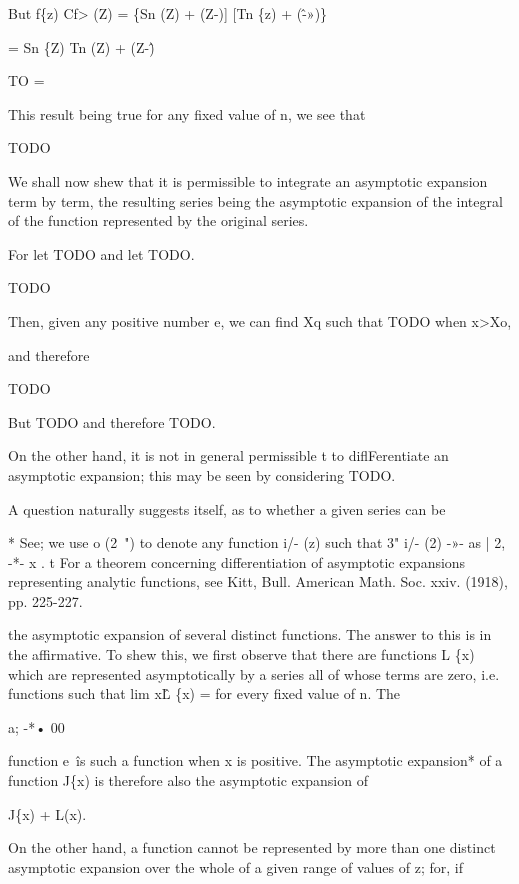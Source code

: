 But f\{z) Cf> (Z) = \{Sn (Z) + (Z-)] [Tn \{z) + (\^-»)\}

= Sn \{Z) Tn (Z) + (Z-\^)

TO =

This result being true for any fixed value of n, we see that

TODO


We shall now shew that it is permissible to integrate an asymptotic
expansion term by term, the resulting series being the asymptotic
expansion of the integral of the function represented by the original
series.

For let TODO and let TODO.

TODO

Then, given any positive number e, we can find Xq such that TODO when
x>Xo,

and therefore

TODO

But TODO and therefore TODO.

On the other hand, it is not in general permissible t to
diflFerentiate an asymptotic expansion; this may be seen by
considering TODO.


A question naturally suggests itself, as to whether a given series can
be

* See; we use o (2~") to denote any function i/- (z) such that
3" i/- (2) -»- as | 2, -*- x . t For a theorem concerning
differentiation of asymptotic expansions representing analytic
functions, see Kitt, Bull. American Math. Soc. xxiv. (1918), pp.
225-227.

%
%

the asymptotic expansion of several distinct functions. The answer to
this is in the affirmative. To shew this, we first observe that there
are functions L \{x) which are represented asymptotically by a series
all of whose terms are zero, i.e. functions such that lim x\^L \{x) =
for every fixed value of n. The

a; -*• 00

function e~\^ is such a function when x is positive. The asymptotic
expansion* of a function J\{x) is therefore also the asymptotic
expansion of

J\{x) + L(x).

On the other hand, a function cannot be represented by more than one
distinct asymptotic expansion over the whole of a given range of
values of z; for, if

